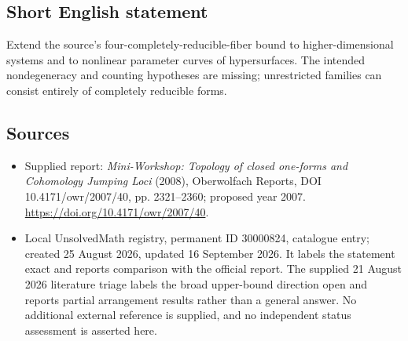 \documentclass[11pt]{article}
\begin{document}
\subsection{Short English statement}
Extend the source's four-completely-reducible-fiber bound to higher-dimensional systems and to nonlinear parameter curves of hypersurfaces. The intended nondegeneracy and counting hypotheses are missing; unrestricted families can consist entirely of completely reducible forms.
\subsection{Sources}
\begin{itemize}
\item Supplied report: \emph{Mini-Workshop: Topology of closed one-forms and Cohomology Jumping Loci} (2008), Oberwolfach Reports, DOI 10.4171/owr/2007/40, pp. 2321--2360; proposed year 2007. \url{https://doi.org/10.4171/owr/2007/40}.
\item Local UnsolvedMath registry, permanent ID 30000824, catalogue entry; created 25 August 2026, updated 16 September 2026. It labels the statement exact and reports comparison with the official report. The supplied 21 August 2026 literature triage labels the broad upper-bound direction open and reports partial arrangement results rather than a general answer. No additional external reference is supplied, and no independent status assessment is asserted here.
\end{itemize}
\end{document}
